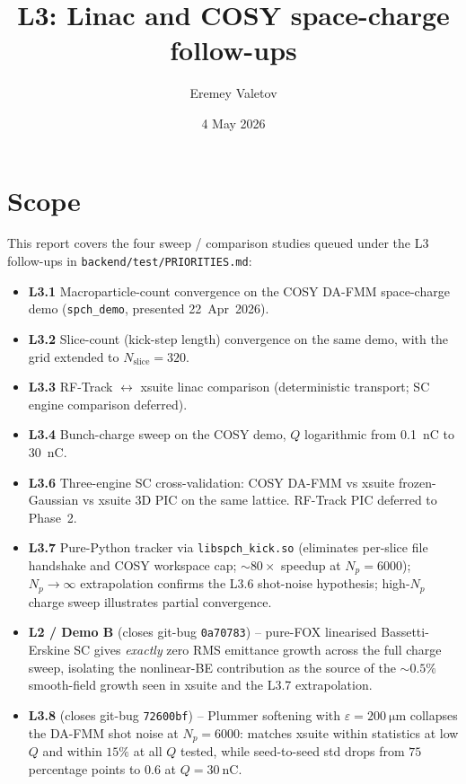 \documentclass[11pt]{article}
\title{L3: Linac and COSY space-charge follow-ups}
\author{Eremey Valetov}
\date{4 May 2026}
\begin{document}
\maketitle

\section{Scope}

This report covers the four sweep / comparison studies queued under the
L3 follow-ups in \texttt{backend/test/PRIORITIES.md}:

\begin{itemize}
\item \textbf{L3.1} Macroparticle-count convergence on the COSY DA-FMM
      space-charge demo (\texttt{spch\_demo}, presented 22~Apr~2026).
\item \textbf{L3.2} Slice-count (kick-step length) convergence on the same
      demo, with the grid extended to $N_\mathrm{slice}=320$.
\item \textbf{L3.3} RF-Track $\leftrightarrow$ xsuite linac comparison
      (deterministic transport; SC engine comparison deferred).
\item \textbf{L3.4} Bunch-charge sweep on the COSY demo, $Q$ logarithmic
      from \SI{0.1}{\nano\coulomb} to \SI{30}{\nano\coulomb}.
\item \textbf{L3.6} Three-engine SC cross-validation: COSY DA-FMM vs
      xsuite frozen-Gaussian vs xsuite 3D PIC on the same lattice.
      RF-Track PIC deferred to Phase~2.
\item \textbf{L3.7} Pure-Python tracker via \texttt{libspch\_kick.so}
      (eliminates per-slice file handshake and COSY workspace cap;
      $\sim 80\times$ speedup at $N_p=6000$); $N_p \to \infty$
      extrapolation confirms the L3.6 shot-noise hypothesis;
      high-$N_p$ charge sweep illustrates partial convergence.
\item \textbf{L2 / Demo B} (closes git-bug \texttt{0a70783}) -- pure-FOX
      linearised Bassetti-Erskine SC gives \emph{exactly} zero RMS
      emittance growth across the full charge sweep, isolating the
      nonlinear-BE contribution as the source of the $\sim 0.5\%$
      smooth-field growth seen in xsuite and the L3.7 extrapolation.
\item \textbf{L3.8} (closes git-bug \texttt{72600bf}) -- Plummer
      softening with $\varepsilon = \SI{200}{\micro\meter}$ collapses
      the DA-FMM shot noise at $N_p=6000$: matches xsuite within
      statistics at low $Q$ and within $15\%$ at all $Q$ tested,
      while seed-to-seed std drops from $75$ percentage points to
      $0.6$ at $Q=\SI{30}{\nano\coulomb}$.
\end{itemize}
\end{document}
